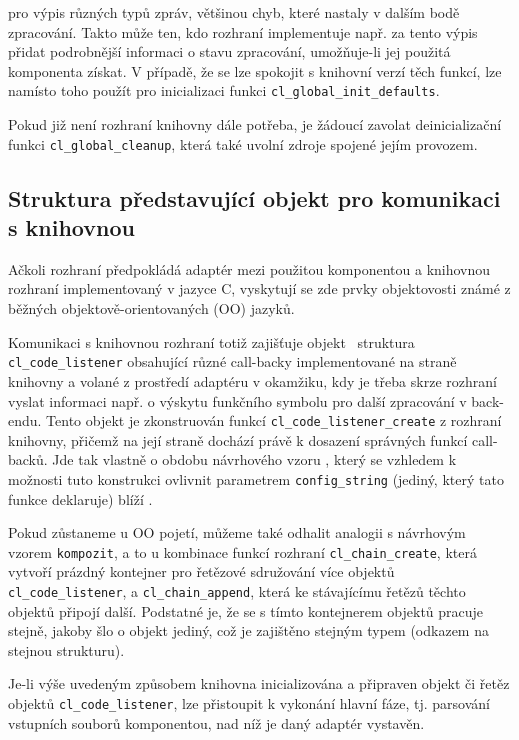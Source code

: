 pro výpis různých typů zpráv, většinou chyb, které nastaly v dalším
bodě zpracování. Takto může ten, kdo rozhraní implementuje
např. za tento výpis přidat podrobnější informaci o stavu zpracování,
umožňuje-li jej použitá komponenta získat. V případě, že se lze
spokojit s knihovní verzí těch funkcí, lze namísto toho
použít pro inicializaci funkci \texttt{cl\_global\_init\_defaults}.

Pokud již není rozhraní knihovny dále potřeba, je žádoucí
zavolat deinicializační funkci \texttt{cl\_global\_cleanup}, která také
uvolní zdroje spojené jejím provozem.

\subsection{Struktura představující objekt pro komunikaci s knihovnou}
\label{code-listener:objekt}
Ačkoli rozhraní předpokládá adaptér mezi použitou komponentou a knihovnou
rozhraní implementovaný v jazyce C, vyskytují se zde prvky
objektovosti známé z běžných objektově-orientovaných (OO) jazyků.

Komunikaci s knihovnou rozhraní totiž zajišťuje objekt \ndash\ struktura
\texttt{cl\_code\_listener} obsahující různé call-backy implementované
na straně knihovny a volané z prostředí adaptéru v okamžiku, kdy je třeba
skrze rozhraní vyslat informaci např. o výskytu funkčního symbolu pro
další zpracování v back-endu. Tento objekt je zkonstruován
funkcí%
\linebreak
\texttt{cl\_code\_listener\_create} z rozhraní knihovny, přičemž
na její straně dochází právě k dosazení správných funkcí call-backů.
Jde tak vlastně o obdobu návrhového vzoru , který se
vzhledem k možnosti tuto konstrukci ovlivnit parametrem
\texttt{config\_string} (jediný, který tato funkce deklaruje) blíží
.

Pokud zůstaneme u OO pojetí, můžeme také odhalit analogii s návrhovým
vzorem \texttt{kompozit}, a to u kombinace funkcí
rozhraní \texttt{cl\_chain\_create}, která vytvoří prázdný kontejner
pro řetězové sdružování více objektů \texttt{cl\_code\_listener},
a \texttt{cl\_chain\_append}, která ke stávajícímu řetězů těchto
objektů připojí další. Podstatné je, že se s tímto kontejnerem
objektů pracuje stejně, jakoby šlo o objekt jediný, což je zajištěno
stejným typem (odkazem na stejnou strukturu).

Je-li výše uvedeným způsobem knihovna inicializována a připraven
objekt či řetěz objektů \texttt{cl\_code\_listener}, lze přistoupit
k vykonání hlavní fáze, tj. parsování vstupních souborů komponentou,
nad níž je daný adaptér vystavěn.

